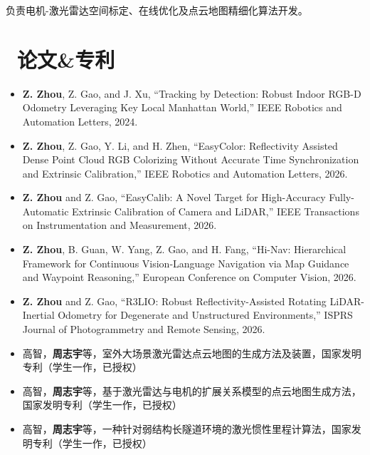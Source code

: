\documentclass{resume}
\begin{document}
负责电机-激光雷达空间标定、在线优化及点云地图精细化算法开发。


\section{\faInfo\ 论文\&专利}
\begin{itemize}[parsep=0.5ex]
  \item \textbf{Z. Zhou}, Z. Gao, and J. Xu, ``Tracking by Detection: Robust Indoor RGB-D Odometry Leveraging Key Local Manhattan World,'' IEEE Robotics and Automation Letters, 2024.

  \item \textbf{Z. Zhou}, Z. Gao, Y. Li, and H. Zhen, ``EasyColor: Reflectivity Assisted Dense Point Cloud RGB Colorizing Without Accurate Time Synchronization and Extrinsic Calibration,'' IEEE Robotics and Automation Letters, 2026.

  \item \textbf{Z. Zhou} and Z. Gao, ``EasyCalib: A Novel Target for High-Accuracy Fully-Automatic Extrinsic Calibration of Camera and LiDAR,'' IEEE Transactions on Instrumentation and Measurement, 2026.

  \item \textbf{Z. Zhou}, B. Guan, W. Yang, Z. Gao, and H. Fang, ``Hi-Nav: Hierarchical Framework for Continuous Vision-Language Navigation via Map Guidance and Waypoint Reasoning,'' European Conference on Computer Vision, 2026.

  \item \textbf{Z. Zhou} and Z. Gao, ``R3LIO: Robust Reflectivity-Assisted Rotating LiDAR-Inertial Odometry for Degenerate and Unstructured Environments,'' ISPRS Journal of Photogrammetry and Remote Sensing, 2026.

  \item 高智，\textbf{周志宇}等，室外大场景激光雷达点云地图的生成方法及装置，国家发明专利（学生一作，已授权）

  \item 高智，\textbf{周志宇}等，基于激光雷达与电机的扩展关系模型的点云地图生成方法，国家发明专利（学生一作，已授权）

  \item 高智，\textbf{周志宇}等，一种针对弱结构长隧道环境的激光惯性里程计算法，国家发明专利（学生一作，已授权）
\end{itemize}
\end{document}
